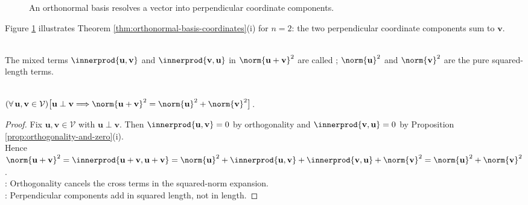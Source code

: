 \begin{figure}[H]
  \centering
  
  \caption{An orthonormal basis resolves a vector into perpendicular coordinate components.}
  \label{fig:orthonormal-coordinates}
\end{figure}

Figure \ref{fig:orthonormal-coordinates} illustrates Theorem \ref{thm:orthonormal-basis-coordinates}(i) for $n=2$: the two perpendicular coordinate components sum to $\mathbf{v}$.\par

\begin{remark} \label{rem:cross-terms} \\
The mixed terms $\innerprod{\mathbf{u},\mathbf{v}}$ and $\innerprod{\mathbf{v},\mathbf{u}}$ in $\norm{\mathbf{u}+\mathbf{v}}^2$ are called ; $\norm{\mathbf{u}}^2$ and $\norm{\mathbf{v}}^2$ are the pure squared-length terms.
\end{remark}

\begin{theorem} \label{thm:pythagorean-inner-product} \\
$(\forall\,\mathbf{u},\mathbf{v}\in\mathcal{V})\bigl[\mathbf{u}\perp\mathbf{v}\Longrightarrow\norm{\mathbf{u}+\mathbf{v}}^2=\norm{\mathbf{u}}^2+\norm{\mathbf{v}}^2\bigr]$.
\begin{proof}
Fix $\mathbf{u},\mathbf{v}\in\mathcal{V}$ with $\mathbf{u}\perp\mathbf{v}$. Then $\innerprod{\mathbf{u},\mathbf{v}}=0$ by orthogonality and $\innerprod{\mathbf{v},\mathbf{u}}=0$ by Proposition \ref{prop:orthogonality-and-zero}(i).\\
Hence $\norm{\mathbf{u}+\mathbf{v}}^2=\innerprod{\mathbf{u}+\mathbf{v},\mathbf{u}+\mathbf{v}}=\norm{\mathbf{u}}^2+\innerprod{\mathbf{u},\mathbf{v}}+\innerprod{\mathbf{v},\mathbf{u}}+\norm{\mathbf{v}}^2=\norm{\mathbf{u}}^2+\norm{\mathbf{v}}^2$.\\
: Orthogonality cancels the cross terms in the squared-norm expansion.\\
: Perpendicular components add in squared length, not in length.
\end{proof}
\end{theorem}

